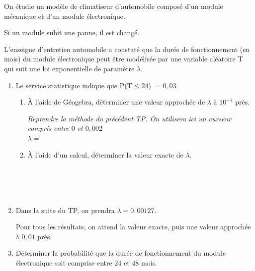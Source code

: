 \begin{exercice_cours}[\quad]{}
On étudie un modèle de climatiseur d’automobile composé d’un module mécanique et d’un module
électronique.

Si un module subit une panne, il est changé.

\medskip

L'enseigne d’entretien automobile a constaté que la durée de
fonctionnement (en mois) du module électronique peut être modélisée par une variable aléatoire T qui suit une loi exponentielle de paramètre $\lambda$.

\begin{enumerate}
	\item Le service statistique indique que P(T$\leq 24$) $= 0,03$.
	
	\begin{enumerate}
		\item À l'aide de Géogebra, déterminer une valeur approchée de $\lambda$ à $10^{-4}$ près.
		
		{\it Reprendre la méthode du précédent TP. On utilisera ici un curseur compris entre $0$ et $0,002$}\\
		
		$\lambda =$ \makebox[0.2\linewidth]{\dotfill} \hfill {}
		
		\smallskip
		\item À l'aide d'un calcul, déterminer la valeur exacte de $\lambda$.\\
		
		\dotfill \\
		
		\dotfill \\
		
		\dotfill \\
		
		\dotfill \\
		
		\dotfill
		
		\smallskip
	\end{enumerate}

	
	\item[~] Dans la suite du TP, on prendra $\lambda = 0,00127$.
	
	Pour tous les résultats, on attend la valeur exacte, puis une valeur approchée à $0,01$ près.
	
	\smallskip
	
	\item Déterminer la probabilité que la durée de fonctionnement du module électronique soit comprise entre 24 et 48 mois.\\
	

\end{enumerate}
\end{exercice_cours}
